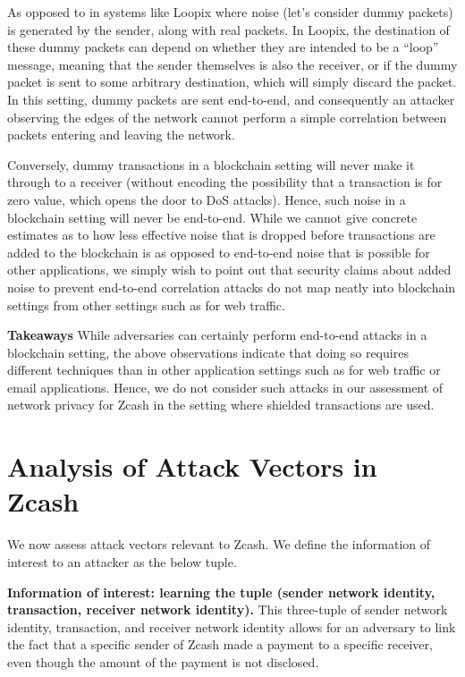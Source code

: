 \documentclass{article}
\begin{document}
As opposed to in systems like Loopix where noise (let's consider dummy packets)
is generated by the sender, along with real packets. In Loopix, the destination
of these dummy packets can depend on whether they are intended to be a ``loop''
message, meaning that the sender themselves is also the receiver, or if the
dummy packet is sent to some arbitrary destination, which will simply discard
the packet. In this setting, dummy packets are sent end-to-end, and
consequently an attacker observing the edges of the network cannot perform a
simple correlation between packets entering and leaving the network.

Conversely, dummy transactions in a blockchain setting will never make it
through to a receiver (without encoding the possibility that a transaction is
for zero value, which opens the door to DoS attacks). Hence, such noise in a
blockchain setting will never be end-to-end. While we cannot give concrete
estimates as to how less effective noise that is dropped before transactions
are added to the blockchain is as opposed to end-to-end noise that is possible
for other applications, we simply wish to point out that security claims about
added noise to prevent end-to-end correlation attacks do not map neatly into
blockchain settings from other settings such as for web traffic.

\textbf{Takeaways}
While adversaries can certainly perform end-to-end attacks in a blockchain
setting, the above observations indicate that doing so requires different
techniques than in other application settings such as for web traffic or email
applications. Hence, we do not consider such attacks in our assessment of
network privacy for Zcash in the setting where shielded transactions are used.


\section{Analysis of Attack Vectors in Zcash}
\label{threat-model}

We now assess attack vectors relevant to Zcash. We define the information of
interest to an attacker as the below tuple.

\textbf{Information of interest: learning the tuple (sender network identity, transaction, receiver network identity).}
This three-tuple of sender network identity, transaction, and receiver network
identity allows for an adversary to link the fact that a
specific sender of Zcash made a payment to a specific receiver, even though the
amount of the payment is not disclosed.
\end{document}
